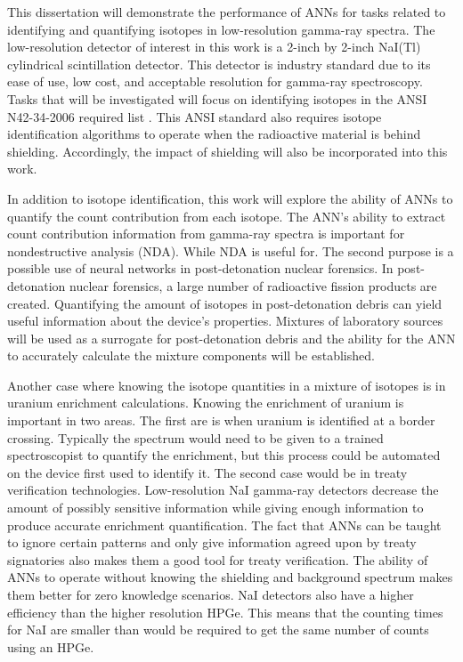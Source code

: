\documentclass[thesis,tocnosub,noragright,centerchapter,12pt,fullpage]{uiucecethesis09}
\begin{document}
This dissertation will demonstrate the performance of ANNs for tasks related to identifying and quantifying isotopes in low-resolution gamma-ray spectra. The low-resolution detector of interest in this work is a 2-inch by 2-inch NaI(Tl) cylindrical scintillation detector. This detector is industry standard due to its ease of use, low cost, and acceptable resolution for gamma-ray spectroscopy. Tasks that will be investigated will focus on identifying isotopes in the ANSI N42-34-2006 required list \cite{ANSI}. This ANSI standard also requires isotope identification algorithms to operate when the radioactive material is behind shielding. Accordingly, the impact of shielding will also be incorporated into this work. 

In addition to isotope identification, this work will explore the ability of ANNs to quantify the count contribution from each isotope. The ANN's ability to extract count contribution information from gamma-ray spectra is important for nondestructive analysis (NDA). While NDA is useful for. The second purpose is a possible use of neural networks in post-detonation nuclear forensics. In post-detonation nuclear forensics, a large number of radioactive fission products are created. Quantifying the amount of isotopes in post-detonation debris can yield useful information about the device's properties. Mixtures of laboratory sources will be used as a surrogate for post-detonation debris and the ability for the ANN to accurately calculate the mixture components will be established.   

Another case where knowing the isotope quantities in a mixture of isotopes is in uranium enrichment calculations. Knowing the enrichment of uranium is important in two areas. The first are is when uranium is identified at a border crossing. Typically the spectrum would need to be given to a trained spectroscopist to quantify the enrichment, but this process could be automated on the device first used to identify it. The second case would be in treaty verification technologies. Low-resolution NaI gamma-ray detectors decrease the amount of possibly sensitive information while giving enough information to produce accurate enrichment quantification. The fact that ANNs can be taught to ignore certain patterns and only give information agreed upon by treaty signatories also makes them a good tool for treaty verification. The ability of ANNs to operate without knowing the shielding and background spectrum makes them better for zero knowledge scenarios. NaI detectors also have a higher efficiency than the higher resolution HPGe. This means that the counting times for NaI are smaller than would be required to get the same number of counts using an HPGe. 
\end{document}
